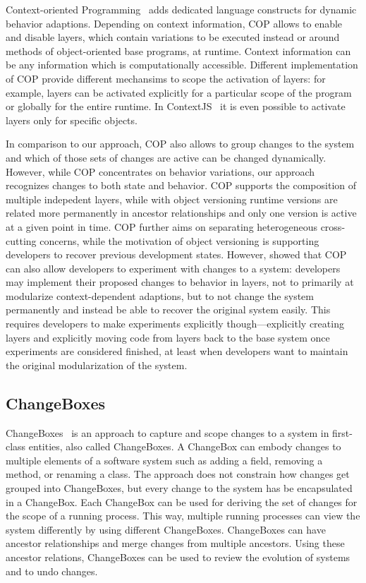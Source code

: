 Context-oriented Programming~\cite{Hirschfeld2008COP} adds dedicated language constructs for dynamic behavior adaptions.
Depending on context information, COP allows to enable and disable layers, which contain variations to be executed instead or around methods of object-oriented base programs, at runtime.
Context information can be any information which is computationally accessible.
Different implementation of COP provide different mechansims to scope the activation of layers: for example, layers can be activated explicitly for a particular scope of the program or globally for the entire runtime.
In ContextJS~\cite{Lincke2011OIC} it is even possible to activate layers only for specific objects.

In comparison to our approach, COP also allows to group changes to the system and which of those sets of changes are active can be changed dynamically.
However, while COP concentrates on behavior variations, our approach recognizes changes to both state and behavior.
COP supports the composition of multiple indepedent layers, while with object versioning runtime versions are related more permanently in ancestor relationships and only one version is active at a given point in time.
COP further aims on separating heterogeneous cross-cutting concerns, while the motivation of object versioning is supporting developers to recover previous development states.
However, \cite{Lincke2012SCS} showed that COP can also allow developers to experiment with changes to a system: developers may implement their proposed changes to behavior in layers, not to primarily at modularize context-dependent adaptions, but to not change the system permanently and instead be able to recover the original system easily.
This requires developers to make experiments explicitly though---explicitly creating layers and explicitly moving code from layers back to the base system once experiments are considered finished, at least when developers want to maintain the original modularization of the system.


\subsection{ChangeBoxes}

ChangeBoxes~\cite{Denker2007EEC} is an approach to capture and scope changes to a system in first-class entities, also called ChangeBoxes.
A ChangeBox can embody changes to multiple elements of a software system such as adding a field, removing a method, or renaming a class.
The approach does not constrain how changes get grouped into ChangeBoxes, but every change to the system has be encapsulated in a ChangeBox.
Each ChangeBox can be used for deriving the set of changes for the scope of a running process.
This way, multiple running processes can view the system differently by using different ChangeBoxes.
ChangeBoxes can have ancestor relationships and merge changes from multiple ancestors.
Using these ancestor relations, ChangeBoxes can be used to review the evolution of systems and to undo changes.

